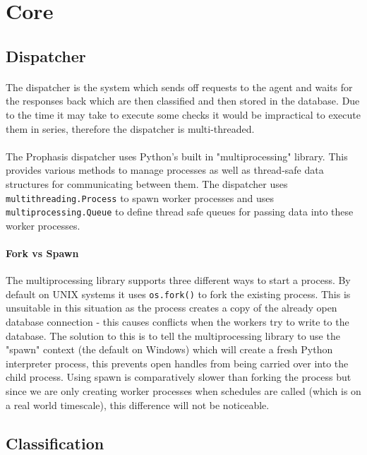 \documentclass[bsc,logo,twoside]{infthesis}
\begin{document}
\section{Core}
\subsection{Dispatcher}
\paragraph*{}
	The dispatcher is the system which sends off requests to the agent and waits
	for the responses back which are then classified and then stored in the
	database.  Due to the time it may take to execute some checks it would be
	impractical to execute them in series, therefore the dispatcher is
	multi-threaded.
	
\paragraph*{}
	The Prophasis dispatcher uses Python's built in "multiprocessing" library.
	This provides various methods to manage processes as well as thread-safe
	data structures for communicating between them.  The dispatcher uses
	\texttt{multithreading.Process} to spawn worker processes and uses
	\texttt{multiprocessing.Queue} to define thread safe queues for passing data
	into these worker processes.
	
\paragraph*{Fork vs Spawn}
	The multiprocessing library supports three different ways to start a process.
	By default on UNIX systems it uses \texttt{os.fork()} to fork the existing
	process. This is unsuitable in this situation as the process creates a copy of
	the already open database connection - this causes conflicts when the
	workers try to write to the database.  The solution to this is to tell the
	multiprocessing library to use the "spawn" context (the default on Windows)
	which will create a fresh Python interpreter process, this prevents open
	handles from being carried over into the child process. Using spawn is
	comparatively slower than forking the process but since we are only creating
	worker processes when schedules are called (which is on a real world
	timescale), this difference will not be noticeable.
	
\subsection{Classification}
\end{document}
